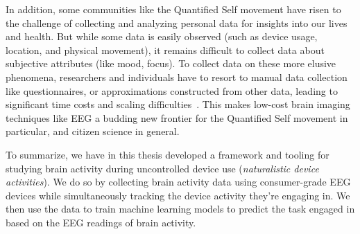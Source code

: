 



In addition, some communities like the Quantified Self movement have risen to the challenge of collecting and analyzing personal data for insights into our lives and health. But while some data is easily observed (such as device usage, location, and physical movement), it remains difficult to collect data about subjective attributes (like mood, focus). To collect data on these more elusive phenomena, researchers and individuals have to resort to manual data collection like questionnaires, or approximations constructed from other data, leading to significant time costs and scaling difficulties~\cite{malhi_promise_2017}. This makes low-cost brain imaging techniques like EEG a budding new frontier for the Quantified Self movement in particular, and citizen science in general.






To summarize, we have in this thesis developed a framework and tooling for studying brain activity during uncontrolled device use (\emph{naturalistic device activities}). We do so by collecting brain activity data using consumer-grade EEG devices while simultaneously tracking the device activity they're engaging in. We then use the data to train machine learning models to predict the task engaged in based on the EEG readings of brain activity.

